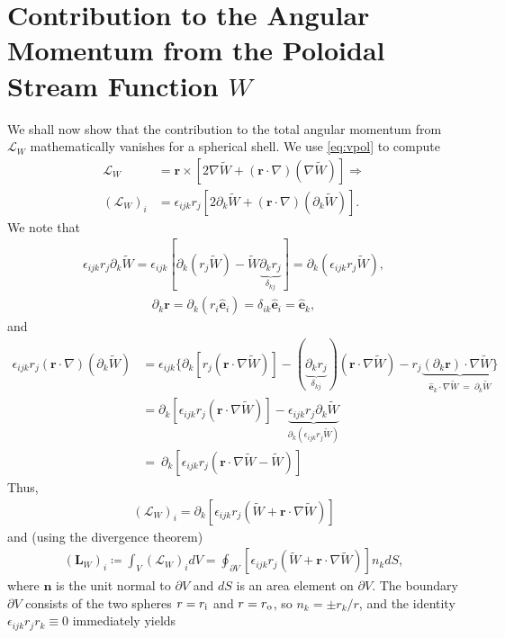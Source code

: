 \documentclass[12pt]{article} %
\newcommand{\tw}{\tilde{W}}
\newcommand{\ri}{r_{\rm{i}}}
\newcommand{\ro}{r_{\rm{o}}}
\begin{document}
\section{Contribution to the Angular Momentum from the Poloidal Stream Function $W$}
We shall now show that the contribution to the total angular momentum from $\bm{\mathcal{L}}_W$ mathematically vanishes for a spherical shell. We use \eqref{eq:vpol} to compute
\begin{align*}
\bm{\mathcal{L}}_W &= \bm{r}\times[2\nabla\tw + (\bm{r}\cdot\nabla)(\nabla\tw)]\Longrightarrow\\
(\bm{\mathcal{L}}_W)_i &= \epsilon_{ijk}r_j[2\partial_k\tw + (\bm{r}\cdot\nabla)(\partial_k\tw)]. 
\end{align*}
We note that 
\begin{align*}
\epsilon_{ijk}r_j\partial_k\tw = \epsilon_{ijk}[\partial_k(r_j\tw) - \tw\underbrace{\partial_kr_j}_{\delta_{kj}}] = \partial_k(\epsilon_{ijk}r_j\tw), 
\end{align*}
\begin{align*}
\partial_k\bm{r} = \partial_k(r_i\hat{\bm{e}}_i) = \delta_{ik}\hat{\bm{e}}_i = \hat{\bm{e}}_k,
\end{align*}
and
\begin{align*}
\epsilon_{ijk}r_j(\bm{r}\cdot\nabla)(\partial_k\tw) &= \epsilon_{ijk}\{\partial_k[r_j(\bm{r}\cdot\nabla\tw)] - (\underbrace{\partial_kr_j}_{\delta_{kj}})(\bm{r}\cdot\nabla\tw)
- r_j\underbrace{(\partial_k\bm{r})\cdot\nabla\tw\}}_{\hat{\bm{e}}_k\cdot\nabla\tw\ =\ \partial_k\tw}\\
&= \partial_k[\epsilon_{ijk}r_j(\bm{r}\cdot\nabla\tw)] - \underbrace{\epsilon_{ijk}r_j\partial_k\tw}_{\partial_k(\epsilon_{ijk}r_j\tw)}\\
&=\ \partial_k[\epsilon_{ijk}r_j(\bm{r}\cdot\nabla\tw -\tw)]
\end{align*}
Thus, 
\begin{align*}
(\bm{\mathcal{L}}_W)_i = \partial_k[\epsilon_{ijk}r_j(\tw + \bm{r}\cdot\nabla\tw)]
\end{align*}
and (using the divergence theorem)
\begin{align*}
(\bm{L}_W)_i \coloneqq \int_V (\bm{\mathcal{L}}_W)_i dV = \oint_{\partial V}[\epsilon_{ijk}r_j(\tw + \bm{r}\cdot\nabla\tw)]n_k dS,
\end{align*}
where $\bm{n}$ is the unit normal to $\partial V$ and $dS$ is an area element on $\partial V$. The boundary $\partial V$ consists of the two spheres $r=\ri$ and $r=\ro$, so $n_k = \pm r_k/r$, and the identity $\epsilon_{ijk}r_jr_k\equiv 0$ immediately yields
\end{document}
